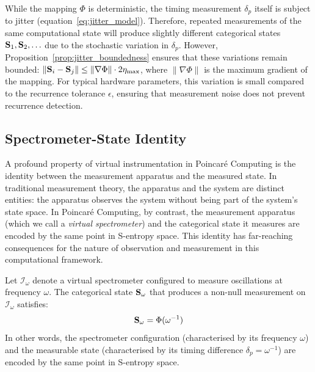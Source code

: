\begin{remark}
\label{rem:measurement_noise}
While the mapping $\Phi$ is deterministic, the timing measurement $\delta_p$ itself is subject to jitter (equation~\eqref{eq:jitter_model}). Therefore, repeated measurements of the same computational state will produce slightly different categorical states $\mathbf{S}_1, \mathbf{S}_2, \ldots$ due to the stochastic variation in $\delta_p$. However, Proposition~\ref{prop:jitter_boundedness} ensures that these variations remain bounded: $\|\mathbf{S}_i - \mathbf{S}_j\| \leq \|\nabla \Phi\| \cdot 2\eta_{\max}$, where $\|\nabla \Phi\|$ is the maximum gradient of the mapping. For typical hardware parameters, this variation is small compared to the recurrence tolerance $\epsilon$, ensuring that measurement noise does not prevent recurrence detection.
\end{remark}

\subsection{Spectrometer-State Identity}

A profound property of virtual instrumentation in Poincaré Computing is the identity between the measurement apparatus and the measured state. In traditional measurement theory, the apparatus and the system are distinct entities: the apparatus observes the system without being part of the system's state space. In Poincaré Computing, by contrast, the measurement apparatus (which we call a \textit{virtual spectrometer}) and the categorical state it measures are encoded by the same point in S-entropy space. This identity has far-reaching consequences for the nature of observation and measurement in this computational framework.

\begin{theorem}
\label{thm:spectrometer_identity}
Let $\mathcal{I}_\omega$ denote a virtual spectrometer configured to measure oscillations at frequency $\omega$. The categorical state $\mathbf{S}_\omega$ that produces a non-null measurement on $\mathcal{I}_\omega$ satisfies:
\begin{equation}
\mathbf{S}_\omega = \Phi(\omega^{-1})
\label{eq:spectrometer_identity}
\end{equation}
In other words, the spectrometer configuration (characterised by its frequency $\omega$) and the measurable state (characterised by its timing difference $\delta_p = \omega^{-1}$) are encoded by the same point in S-entropy space.
\end{theorem}

